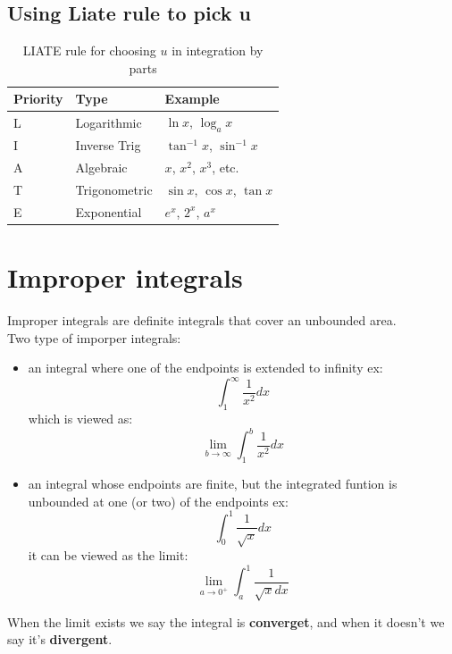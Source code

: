 \documentclass{article}
\begin{document}
                            \subsection{Using Liate rule to pick u}
                                \begin{table}[h!]
                                \centering
                                \begin{tabular}{lll}
                                \toprule
                                \textbf{Priority} & \textbf{Type} & \textbf{Example} \\
                                \midrule
                                L & Logarithmic      & \( \ln x \), \( \log_a x \) \\
                                I & Inverse Trig     & \( \tan^{-1}x \), \( \sin^{-1}x \) \\
                                A & Algebraic        & \( x \), \( x^2 \), \( x^3 \), etc. \\
                                T & Trigonometric    & \( \sin x \), \( \cos x \), \( \tan x \) \\
                                E & Exponential      & \( e^x \), \( 2^x \), \( a^x \) \\
                                \bottomrule
                                \end{tabular}
                                \caption{LIATE rule for choosing \( u \) in integration by parts}
                                \end{table}

                \section{Improper integrals}
                            Improper integrals are definite integrals that cover an unbounded area. \\ 
                            Two type of imporper integrals: 
                            \begin{itemize}
                                \item an integral where one of the endpoints is extended to infinity ex: 
                                    \[\int_{1}^{\infty} \frac{1}{x^2} dx\]
                                    which is viewed as: 
                                    \[\lim_{b \to \infty} \int_{1}^{b} \frac{1}{x^2} dx\]
                                \item an integral whose endpoints are finite, but the integrated funtion is unbounded at one (or two) of the endpoints ex:
                                        \[\int_{0}^{1} \frac{1}{\sqrt{x}} dx\]
                                        it can be viewed as the limit: 
                                        \[\lim_{a \to 0^+} \int_{a}^{1} \frac{1}{\sqrt{x} dx}\]
                            \end{itemize}
                            When the limit exists we say the integral is \textbf{converget}, and when it doesn't we say it's \textbf{divergent}.
\end{document}
